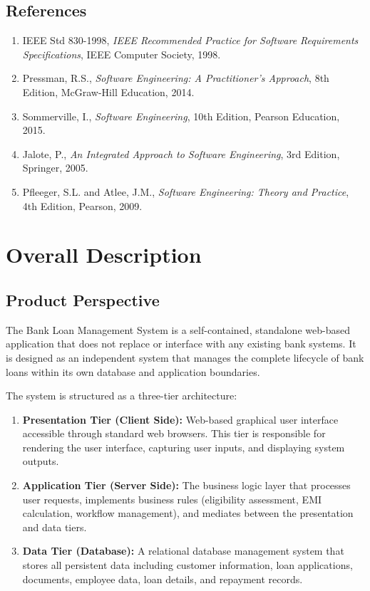 \subsection{References}

\begin{enumerate}
  \item IEEE Std 830-1998, \textit{IEEE Recommended Practice for Software Requirements Specifications}, IEEE Computer Society, 1998.
  \item Pressman, R.S., \textit{Software Engineering: A Practitioner's Approach}, 8th Edition, McGraw-Hill Education, 2014.
  \item Sommerville, I., \textit{Software Engineering}, 10th Edition, Pearson Education, 2015.
  \item Jalote, P., \textit{An Integrated Approach to Software Engineering}, 3rd Edition, Springer, 2005.
  \item Pfleeger, S.L. and Atlee, J.M., \textit{Software Engineering: Theory and Practice}, 4th Edition, Pearson, 2009.
\end{enumerate}

\section{Overall Description}

\subsection{Product Perspective}

The Bank Loan Management System is a self-contained, standalone web-based application that does not replace or interface with any existing bank systems. It is designed as an independent system that manages the complete lifecycle of bank loans within its own database and application boundaries.

The system is structured as a three-tier architecture:

\begin{enumerate}
  \item \textbf{Presentation Tier (Client Side):} Web-based graphical user interface accessible through standard web browsers. This tier is responsible for rendering the user interface, capturing user inputs, and displaying system outputs.
  \item \textbf{Application Tier (Server Side):} The business logic layer that processes user requests, implements business rules (eligibility assessment, EMI calculation, workflow management), and mediates between the presentation and data tiers.
  \item \textbf{Data Tier (Database):} A relational database management system that stores all persistent data including customer information, loan applications, documents, employee data, loan details, and repayment records.
\end{enumerate}

